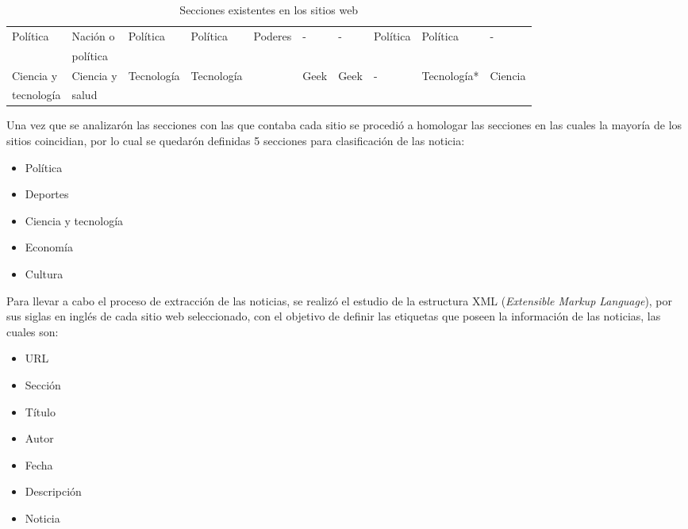 \begin{table}[htbp]
{\begin{tabular}[H]{|l|l|l|l|l|l|l|l|l|l|}
        Política      & Nación o & Política   & Política      & Poderes               & -             & -         & Política          & Política      & -   \\ 
        & política & & & & & & & & \\ 
        \hline

        Ciencia y & Ciencia y & Tecnología & Tecnología    &                       & Geek          & Geek      & -                 & Tecnología*      & Ciencia\\
        tecnología & salud & & & & & & & & \\ 
        \hline        

    \end{tabular}%
}
\caption[Tabla]{Secciones existentes en los sitios web}
\label{tabla:sitios}
\end{table}

Una vez que se analizarón las secciones con las que contaba cada sitio se procedió a homologar las secciones en las cuales la mayoría de los sitios coincidian, por lo cual se quedarón definidas 5 secciones para clasificación de las noticia:

\begin{itemize}
    \item Política
    \item Deportes
    \item Ciencia y tecnología
    \item Economía
    \item Cultura
\end{itemize}

Para llevar a cabo el proceso de extracción de las noticias, se realizó el estudio 
de la estructura XML (\textit{Extensible Markup Language}), por sus siglas en inglés de cada sitio web seleccionado, con 
el objetivo de definir las etiquetas que poseen la información de las noticias, las cuales son:

\begin{itemize}
  \item URL
  \item Sección
  \item Título
  \item Autor
  \item Fecha
  \item Descripción
  \item Noticia
\end{itemize} 


